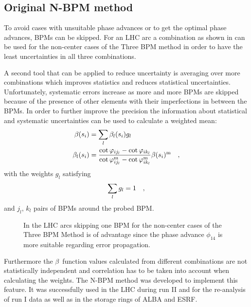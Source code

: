 \subsection{Original N-BPM method}

To avoid cases with unsuitable phase advances or to get the optimal phase advances, BPMs can be
skipped. For an LHC arc a combination as shown in  can be used for the non-center
cases of the Three BPM method in order to have the least uncertainties in all three combinations.

A second tool that can be applied to reduce uncertainty is averaging over more combinations which
improves statistics and reduces statistical uncertainties.
Unfortunately, systematic errors increase
as more and more BPMs are skipped because of the presence of other elements with their imperfections in between the
BPMs.
In order to further improve the precision the information about statistical and systematic
uncertainties can be used to calculate a weighted mean:
%
\begin{align}
    \beta(s_i) &= \sum\limits_{l} \beta_l(s_i) g_l
    \label{eq_beta_wmean}\\
    \beta_l(s_i) &=
        \frac{
            \cot\varphi_{ij_l} - \cot\varphi_{ik_l}
        }{
            \cot\varphi_{ij_l}^\text{m} - \cot\varphi_{ik_l}^\text{m}
        } \beta(s_i)^\text{m}
    \quad ,
    \label{eq_beta_l}
\end{align}
%
with the weights $g_l$ satisfying
%
\begin{equation}
    \sum\limits_l g_l = 1
    \quad ,
\end{equation}
%
and $j_l,\,k_l$ pairs of BPMs around the probed BPM.


\begin{figure}
    \centering
    
    \caption{In the LHC arcs skipping one BPM for the non-center cases of the Three BPM Method
    is of advantage since the phase advance $\phi_{14}$
    is more suitable regarding error propagation.}
    \label{fig_skip_one_BPM}
\end{figure}
%
Furthermore the $\beta$~function values calculated from different combinations are not statistically
independent and correlation has to be taken into account when calculating the weights.
The N-BPM method \cite{LangnerNBPM, Langner2017} was developed to implement this feature.
It was successfully used in the LHC during run II and for the re-analysis of run I data
as well as in the storage rings of ALBA and ESRF.

